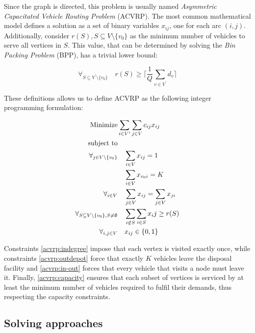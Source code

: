 Since the graph is directed, this problem is usually named \textit{Asymmetric
Capacitated Vehicle Routing Problem} (ACVRP).  The most common mathematical
model\citep{Toth01} defines a solution as a set of binary variables $x_{ij}$,
one for each arc $(i, j)$.  Additionally, consider $r(S), S \subseteq V
\setminus \{v_0\}$ as the minimum number of vehicles to serve all vertices in
$S$. This value, that can be determined by solving the \textit{Bin Packing
Problem} (BPP), has a trivial lower bound:

\begin{equation}
\forall_{S \subseteq V^\prime \setminus \{v_0\}} \quad r(S) \geq
\lceil\frac{1}{Q} \sum_{v \in V^\prime} d_{v} \rceil
\end{equation}

These definitions allows us to define ACVRP as the following integer
programming formulation:

\begin{align}
	\mbox{Minimize} & \sum_{i \in V^\prime} \sum_{j \in V} c_{ij} x_{ij}
	\\
	\mbox{subject to} & \notag{}
	\\
	\forall_{j \in V \setminus \{v_0\}} & \quad \sum_{i \in V} x_{ij} = 1
	\label{acvrp:indegree}
	\\
	& \quad \sum_{i \in V} x_{v_0i} = K
	\label{acvrp:outdepot}
	\\
	\forall_{i \in V} & \quad \sum_{j \in V} x_{ij} = \sum_{j \in V} x_{ji}
	\label{acvrp:in-out}
	\\
	\forall_{S \subseteq V \setminus \{v_0\}, S \neq \emptyset} & \quad
	\sum_{i \notin S} \sum_{i \in S} x_ij \geq r(S)
	\label{acvrp:capacity}
	\\
	\forall_{i, j \in V} & \quad x_{ij} \in \{0, 1\}
\end{align}

Constraints \eqref{acvrp:indegree} impose that each vertex is visited exactly
once, while constraints \eqref{acvrp:outdepot} force that exactly $K$ vehicles
leave the disposal facility and \eqref{acvrp:in-out} forces that every vehicle
that visits a node must leave it. Finally, \eqref{acvrp:capacity} ensures that
each subset of vertices is serviced by at least the minimum number of vehicles
required to fulfil their demands, thus respecting the capacity constraints.




\subsection{Solving approaches}
\label{section:vrp-approaches}

